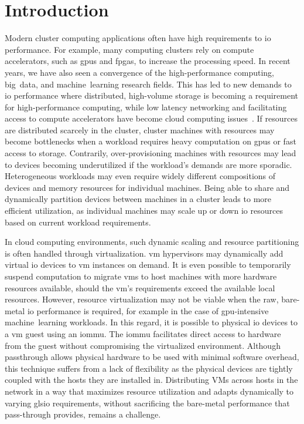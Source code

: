 \chapter{Introduction}\label{chapter:intro}
Modern cluster computing applications often have high requirements to \gls{io} performance.
%
For example, many computing clusters rely on compute accelerators, such as \glspl{gpu} and \glspl{fpga}, to increase the processing speed.
%
In recent years, we have also seen a convergence of the high-performance computing, big~data, and machine~learning research fields.
%
This has led to new demands to \gls{io} performance where distributed, high-volume storage is becoming a requirement for high-performance computing, while low latency networking and facilitating access to compute accelerators have become cloud computing issues~\cite{Trivedi2011,Coates2013,Taherkordi2018}.
%
If resources are distributed scarcely in the cluster, cluster machines with resources may become bottlenecks when a workload requires heavy computation on \glspl{gpu} or fast access to storage.
%
Contrarily, over-provisioning machines with resources may lead to devices becoming underutilized if the workload's demands are more sporadic.
%
Heterogeneous workloads may even require widely different compositions of devices and memory resources for individual machines.
%
Being able to share and dynamically partition devices between machines in a cluster leads to more efficient
utilization, as individual machines may scale up or down \gls{io} resources based on current workload requirements.



In cloud computing environments, such dynamic scaling and resource partitioning is often handled through virtualization. 
\Gls{vm} \glspl{hypervisor} may dynamically add virtual \gls{io} devices to \gls{vm} instances on demand.
%
It is even possible to temporarily suspend computation to migrate \glspl{vm} to \gls{host} machines with more hardware resources available, should the \gls{vm}'s requirements exceed the available local resources.
%
However, resource virtualization may not be viable when the raw, bare-metal \gls{io} performance is required, for example in the case of \gls{gpu}-intensive machine~learning workloads.
%
In this regard, it is possible to  physical \gls{io} devices to a \gls{vm} \gls{guest} using an \gls{iommu}.
%
The \gls{iommu} facilitates direct access to hardware from the \gls{guest} without compromising the virtualized environment.
%
Although \gls{passthrough} allows physical hardware to be used with minimal software overhead, this technique suffers from a lack of flexibility as the physical devices are tightly coupled with the hosts they are installed in.
%
Distributing VMs across hosts in the network in a way that maximizes resource utilization and adapts dynamically to varying gls{io} requirements, without sacrificing the bare-metal performance that pass-through provides, remains a challenge.




